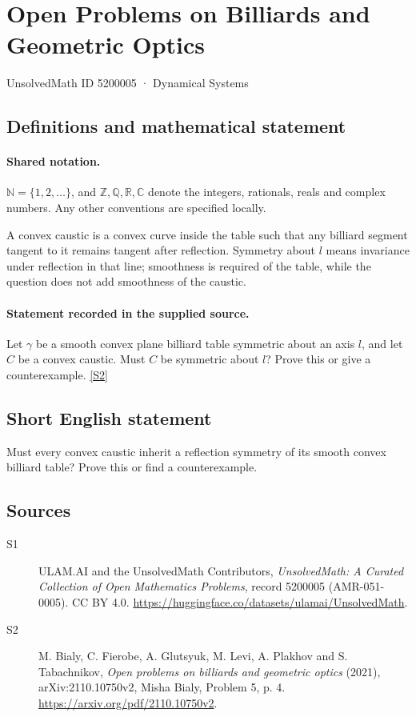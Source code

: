 \documentclass[11pt]{article}
\newcommand{\sref}[2]{\hyperlink{source:#1:#2}{[S#2]}}
\begin{document}
\setcounter{section}{5200004}
\section{Open Problems on Billiards and Geometric Optics}\label{5200005}
{\small\sffamily UnsolvedMath ID 5200005 · Dynamical Systems}
\subsection{Definitions and mathematical statement}

\paragraph{Shared notation.}$\mathbb N=\{1,2,\ldots\}$, and $\mathbb Z,\mathbb Q,\mathbb R,\mathbb C$ denote the integers, rationals, reals and complex numbers. Any other conventions are specified locally.


A convex caustic is a convex curve inside the table such that any billiard segment tangent to it remains tangent after reflection. Symmetry about $l$ means invariance under reflection in that line; smoothness is required of the table, while the question does not add smoothness of the caustic.
\paragraph{Statement recorded in the supplied source.}
Let $\gamma$ be a smooth convex plane billiard table symmetric about an axis $l$, and let $C$ be a convex caustic. Must $C$ be symmetric about $l$? Prove this or give a counterexample. \sref{5200005}{2}
\subsection{Short English statement}
Must every convex caustic inherit a reflection symmetry of its smooth convex billiard table? Prove this or find a counterexample.
\subsection{Sources}
\begin{description}
\item[\hypertarget{source:5200005:1}{S1}] ULAM.AI and the UnsolvedMath Contributors, \emph{UnsolvedMath: A Curated Collection of Open Mathematics Problems}, record 5200005 (AMR-051-0005). CC BY 4.0. \url{https://huggingface.co/datasets/ulamai/UnsolvedMath}.
\item[\hypertarget{source:5200005:2}{S2}] M. Bialy, C. Fierobe, A. Glutsyuk, M. Levi, A. Plakhov and S. Tabachnikov, \emph{Open problems on billiards and geometric optics} (2021), arXiv:2110.10750v2, Misha Bialy, Problem 5, p. 4. \url{https://arxiv.org/pdf/2110.10750v2}.
\end{description}
\label{end:5200005}
\end{document}
